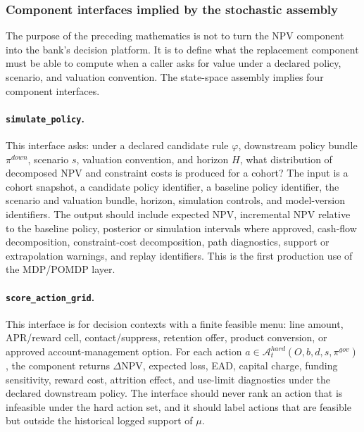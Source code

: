 \documentclass[11pt]{article}
\newcommand{\NPV}{\mathrm{NPV}}
\newcommand{\1}{\mathbf{1}}
\newcommand{\code}[1]{\nolinkurl{#1}}
\begin{document}
\subsubsection{Component interfaces implied by the stochastic assembly}
\label{subsec:state-space-component-interfaces}

The purpose of the preceding mathematics is not to turn the NPV component into
the bank's decision platform. It is to define what the replacement component must
be able to compute when a caller asks for value under a declared policy,
scenario, and valuation convention. The state-space assembly implies four
component interfaces.

\paragraph{\code{simulate_policy}.}
This interface asks: under a declared candidate rule $\varphi$, downstream
policy bundle $\pi^{down}$, scenario $s$, valuation convention, and horizon $H$,
what distribution of decomposed NPV and constraint costs is produced for a
cohort? The input is a cohort snapshot, a candidate policy identifier, a baseline
policy identifier, the scenario and valuation bundle, horizon, simulation
controls, and model-version identifiers. The output should include expected NPV,
incremental NPV relative to the baseline policy, posterior or simulation
intervals where approved, cash-flow decomposition, constraint-cost
decomposition, path diagnostics, support or extrapolation warnings, and replay
identifiers. This is the first production use of the MDP/POMDP layer.

\paragraph{\code{score_action_grid}.}
This interface is for decision contexts with a finite feasible menu: line amount,
APR/reward cell, contact/suppress, retention offer, product conversion, or
approved account-management option. For each action
$a\in\mathcal{A}^{hard}_{t}(O,b,d,s,\pi^{gov})$, the component returns
$\Delta \NPV$, expected loss, EAD, capital charge, funding sensitivity, reward
cost, attrition effect, and use-limit diagnostics under the declared downstream
policy. The interface should never rank an action that is infeasible under the
hard action set, and it should label actions that are feasible but outside the
historical logged support of $\mu$.
\end{document}
